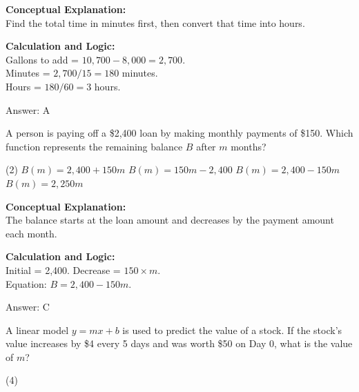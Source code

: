\documentclass[11pt,paper=a4,answers]{exam}
\begin{document}
\begin{questions}
\begin{solution}
\textbf{Conceptual Explanation:} \\
Find the total time in minutes first, then convert that time into hours.

\vspace{10pt}
\textbf{Calculation and Logic:} \\
Gallons to add = $10,700 - 8,000 = 2,700$. \\
Minutes = $2,700 / 15 = 180$ minutes. \\
Hours = $180 / 60 = 3$ hours.

\vspace{15pt}
Answer: \colorbox{yellow!100}{A}
\end{solution}

\vspace{20pt}

\question
A person is paying off a \$2,400 loan by making monthly payments of \$150. Which function represents the remaining balance $B$ after $m$ months?
\begin{tasks}(2)
    \task $B(m) = 2,400 + 150m$
    \task $B(m) = 150m - 2,400$
    \task $B(m) = 2,400 - 150m$
    \task $B(m) = 2,250m$
\end{tasks}

\begin{solution}
\textbf{Conceptual Explanation:} \\
The balance starts at the loan amount and decreases by the payment amount each month.

\vspace{10pt}
\textbf{Calculation and Logic:} \\
Initial = 2,400. Decrease = $150 \times m$. \\
Equation: $B = 2,400 - 150m$.

\vspace{15pt}
Answer: \colorbox{yellow!100}{C}
\end{solution}

\vspace{20pt}

\question
A linear model $y = mx + b$ is used to predict the value of a stock. If the stock's value increases by \$4 every 5 days and was worth \$50 on Day 0, what is the value of $m$?
\begin{tasks}(4)
\end{tasks}


\end{questions}
\end{document}
